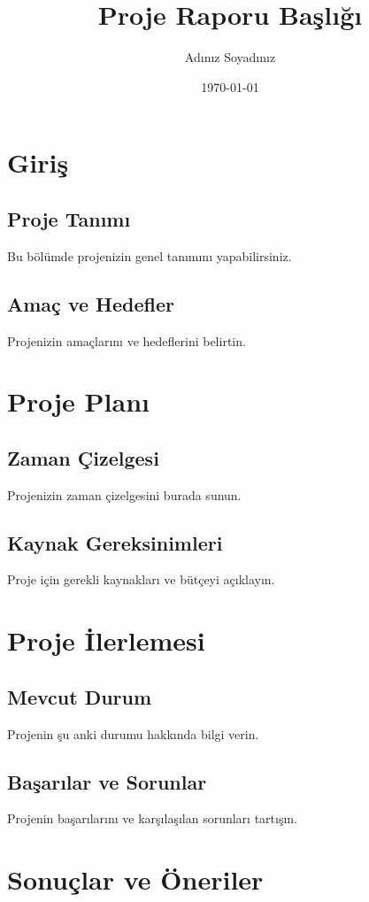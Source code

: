 \documentclass[a4paper,12pt]{report}
\title{Proje Raporu Başlığı}
\author{Adınız Soyadınız}
\date{\today}
\begin{document}
\maketitle

\tableofcontents

\chapter{Giriş}
\section{Proje Tanımı}
Bu bölümde projenizin genel tanımını yapabilirsiniz.

\section{Amaç ve Hedefler}
Projenizin amaçlarını ve hedeflerini belirtin.

\chapter{Proje Planı}
\section{Zaman Çizelgesi}
Projenizin zaman çizelgesini burada sunun.

\section{Kaynak Gereksinimleri}
Proje için gerekli kaynakları ve bütçeyi açıklayın.

\chapter{Proje İlerlemesi}
\section{Mevcut Durum}
Projenin şu anki durumu hakkında bilgi verin.

\section{Başarılar ve Sorunlar}
Projenin başarılarını ve karşılaşılan sorunları tartışın.

\chapter{Sonuçlar ve Öneriler}
\end{document}
